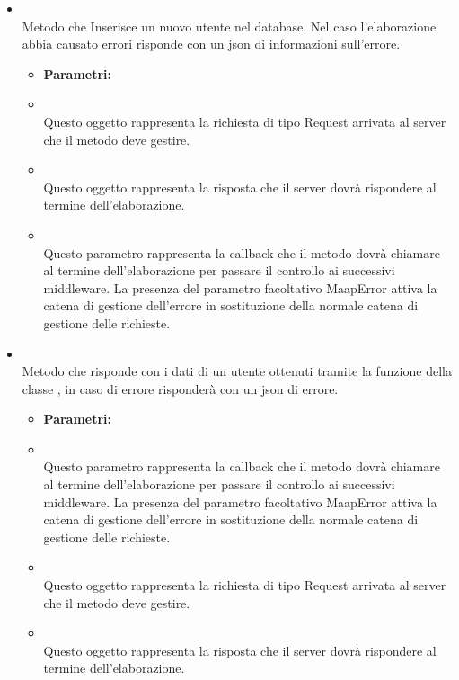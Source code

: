 \begin{itemize}
\begin{itemize}
\end{itemize}
\item[] \textbf{} \\ Metodo che Inserisce un nuovo utente nel database. Nel caso l'elaborazione abbia causato errori risponde con un json di informazioni sull'errore.
\begin{itemize}\addtolength{\itemsep}{-0.5\baselineskip}
\item[] \textbf{Parametri:}
\item[]  \\ Questo oggetto rappresenta la richiesta di tipo Request arrivata al server che il metodo deve gestire.
\item[]  \\ Questo oggetto rappresenta la risposta che il server dovrà rispondere al termine dell'elaborazione.
\item[]  \\ Questo parametro rappresenta la callback che il metodo dovrà chiamare al termine dell'elaborazione per passare il controllo ai successivi middleware. La presenza del parametro facoltativo MaapError attiva la catena di gestione dell'errore in sostituzione della normale catena di gestione delle richieste.
\end{itemize}
\item[] \textbf{} \\ Metodo che risponde con i dati di un utente ottenuti tramite la funzione  della classe , in caso di errore risponderà con un json di errore.
\begin{itemize}\addtolength{\itemsep}{-0.5\baselineskip}
\item[] \textbf{Parametri:}
\item[]  \\ Questo parametro rappresenta la callback che il metodo dovrà chiamare al termine dell'elaborazione per passare il controllo ai successivi middleware. La presenza del parametro facoltativo MaapError attiva la catena di gestione dell'errore in sostituzione della normale catena di gestione delle richieste.
\item[]  \\ Questo oggetto rappresenta la richiesta di tipo Request arrivata al server che il metodo deve gestire.
\item[]  \\ Questo oggetto rappresenta la risposta che il server dovrà rispondere al termine dell'elaborazione.

\end{itemize}
\end{itemize}
